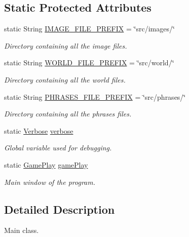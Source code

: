 \subsection*{Static Protected Attributes}
\begin{DoxyCompactItemize}
\item 
static String \hyperlink{a00017_a1e42124b5f083b3b4f1e6eb5ba774552}{I\-M\-A\-G\-E\-\_\-\-F\-I\-L\-E\-\_\-\-P\-R\-E\-F\-I\-X} = \char`\"{}src/images/\char`\"{}
\begin{DoxyCompactList}\small\item\em Directory containing all the image files. \end{DoxyCompactList}\item 
static String \hyperlink{a00017_a7502fe9b6042326072c5be7be632cc6c}{W\-O\-R\-L\-D\-\_\-\-F\-I\-L\-E\-\_\-\-P\-R\-E\-F\-I\-X} = \char`\"{}src/world/\char`\"{}
\begin{DoxyCompactList}\small\item\em Directory containing all the world files. \end{DoxyCompactList}\item 
static String \hyperlink{a00017_a076b568405c08c4b22e22a1d7c985124}{P\-H\-R\-A\-S\-E\-S\-\_\-\-F\-I\-L\-E\-\_\-\-P\-R\-E\-F\-I\-X} = \char`\"{}src/phrases/\char`\"{}
\begin{DoxyCompactList}\small\item\em Directory containing all the phrases files. \end{DoxyCompactList}\item 
static \hyperlink{a00035}{Verbose} \hyperlink{a00017_a83cf82b16e2feb6ede60c8c076be10ec}{verbose}
\begin{DoxyCompactList}\small\item\em Global variable used for debugging. \end{DoxyCompactList}\item 
static \hyperlink{a00010}{Game\-Play} \hyperlink{a00017_a1abf384f2796e5ab254ff71c36ef939d}{game\-Play}
\begin{DoxyCompactList}\small\item\em Main window of the program. \end{DoxyCompactList}\end{DoxyCompactItemize}


\subsection{Detailed Description}
Main class. 

